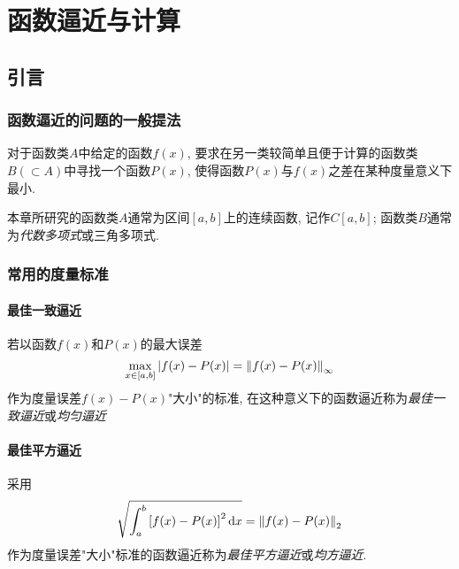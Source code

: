 \chapter{函数逼近与计算}

\section{引言}

\subsection{函数逼近的问题的一般提法}

对于函数类$A$中给定的函数$f(x)$, 要求在另一类较简单且便于计算的函数类$B(\subset A)$中寻找一个函数$P(x)$, 使得函数$P(x)$与$f(x)$之差在某种度量意义下最小.

本章所研究的函数类$A$通常为区间$[a,b]$上的连续函数, 记作$C[a,b]$; 函数类$B$通常为\emph{代数多项式}或三角多项式.

\subsection{常用的度量标准}

\subsubsection{最佳一致逼近}

\begin{definition}[最佳一致逼近]
    若以函数$f(x)$和$P(x)$的最大误差
    \begin{equation*}
        \max_{x\in[a,b]}\abs{f(x)-P(x)}=\norm{f(x)-P(x)}_\infty
    \end{equation*}
    作为度量误差$f(x)-P(x)$"大小"的标准, 在这种意义下的函数逼近称为\emph{最佳一致逼近}或\emph{均匀逼近}
\end{definition}

\subsubsection{最佳平方逼近}

\begin{definition}[最佳平方逼近]
    采用
    \begin{equation*}
        \sqrt{\int_a^b\left[f(x)-P(x)\right]^2\dd{x}}=\norm{f(x)-P(x)}_2
    \end{equation*}
    作为度量误差"大小"标准的函数逼近称为\emph{最佳平方逼近}或\emph{均方逼近}.
\end{definition}